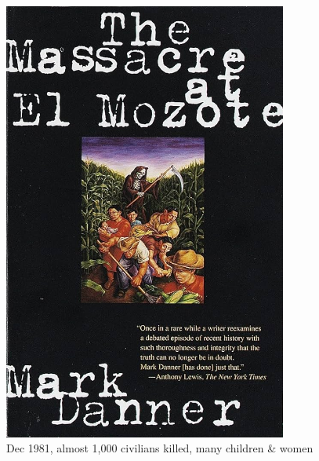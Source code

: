 \documentclass[aspectratio=43]{beamer}
\begin{document}
\begin{frame}
\begin{minipage}{0.49\textwidth}
\includegraphics[width = 0.7\textwidth]{img/mozote_book}\\
Dec 1981, almost 1,000 civilians killed, many children \& women
\end{minipage}

\end{frame}
\end{document}

